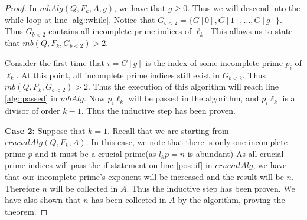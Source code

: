 \documentclass[../paper.tex]{subfiles}
\begin{document}
\begin{proof}
In $mbAlg(Q,F_k,A, g)$, we have that $g \geq 0$. Thus we will
descend into the while loop at line \ref{alg::while}. Notice 
that $G_{b<2} = \{G[0], G[1],
..., G[g]\}$. Thus $G_{b<2}$ contains all incomplete prime indices
of $\ell_k$. This allows us to state that $mb(Q,F_k, G_{b<2}) > 2$.

Consider the first time that $i = G[g]$ is the index of some
incomplete prime $p_i$ of $\ell_k$. At this point, 
all incomplete prime indices still exist in $G_{b<2}$. 
Thus $mb(Q, F_k, G_{b<2}) > 2$. Thus the execution of this
algorithm will reach line \ref{alg::passed} in $mbAlg$.
Now $p_i \ell_k$ will be passed in the algorithm, and $p_i \ell_k$
is a divisor of order $k-1$. Thus the inductive step has been proven.

\textbf{Case 2:} Suppose that $k = 1$. Recall that we are starting 
from $crucialAlg(Q,
F_k, A)$. In this case, we note that there is only one incomplete prime 
$p$ and it must be a crucial prime(as $l_k p = n$ is abundant)
As all crucial prime indices will pass the if statement on line
\ref{pos::if} in $crucialAlg$, we have that our incomplete prime's exponent will be 
increased and the result will be $n$. Therefore $n$ will be 
collected in $A$. Thus the inductive step has 
been proven. We have also shown that $n$ has been
collected in $A$ by the algorithm, proving the theorem.
\end{proof}
\end{document}
